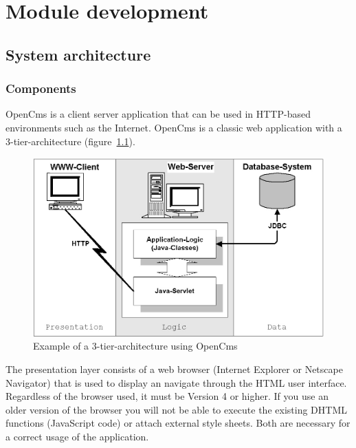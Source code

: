 \chapter{Module development}

\section{System architecture}
\subsection{Components}

OpenCms is a client server application that can be used in HTTP-based
environments such as the Internet. OpenCms is a classic web application
with a 3-tier-architecture (figure~\ref {3-tier1}).

\begin{figure}
\begin{center}
\includegraphics[clip,width=\sgw]{pics/modules/1}
\end{center}
\caption[3-tier-achitecture]{Example of a 3-tier-architecture using OpenCms}
\label{3-tier1}
\end{figure}

The presentation layer consists of a web browser (Internet Explorer or
Netscape Navigator) that is used to display an navigate through the HTML
user interface. Regardless of the browser used, it must be Version 4 or
higher. If you use an older version of the browser you will not be able
to execute the existing DHTML functions (JavaScript code) or attach
external style sheets. Both are necessary for a correct  usage of the
application.

